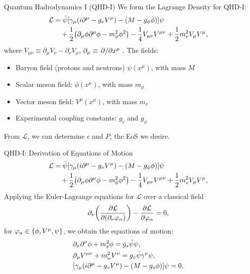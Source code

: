 \documentclass[handout]{beamer}
\newcommand{\Letter}[1]{\mathcal{#1}}
\newcommand{\Lag}{\Letter{L}}
\newcommand{\Def}{\equiv}
\newcommand{\p}{\partial}
\begin{document}
    \begin{frame}{Quantum Hadrodynamics I (QHD-I)}
        We form the Lagrange Density for QHD-I: \pause
        \begin{align*}
            \Lag & = \bar{\psi} \bqty{\gamma_\mu(i\p^\mu -g_v V^\mu) - (M-g_\phi\phi)} \psi \nonumber\\
            & \quad + \frac{1}{2} \pqty{\p_\mu \phi \p^\mu \phi - m_\phi^2 \phi^2} - \frac{1}{4} V_{\mu\nu}V^{\mu\nu} + \frac{1}{2} m_v^2 V_\mu V^\mu,
        \end{align*}
        where $V_{\mu\nu}\Def\p_\mu V_\nu - \p_\nu V_\mu$, $\p_\mu \Def \pdv*{x^\mu}.$ The fields:
        \begin{itemize}
            \item Baryon field (protons and neutrons) $\psi(x^\mu)$, with mass $M$ 
            \item Scalar meson field: $\phi(x^\mu)$, with mass $m_\phi$ 
            \item Vector meson field: $V^\mu(x^\mu)$, with mass $m_v$
            \item Experimental coupling constants: $g_v$ and $g_\phi$ \pause
        \end{itemize}
        From $\Lag$, we can determine $\epsilon$ and $P$, the EoS we desire.
    \end{frame}

    \begin{frame}{QHD-I: Derivation of Equations of Motion}
        \begin{align*}
            \Lag & = \bar{\psi} \bqty{\gamma_\mu(i\p^\mu -g_v V^\mu) - (M-g_\phi\phi)} \psi \nonumber\\
            & \quad + \frac{1}{2} \pqty{\p_\mu \phi \p^\mu \phi - m_\phi^2 \phi^2} - \frac{1}{4} V_{\mu\nu}V^{\mu\nu} + \frac{1}{2} m_v^2 V_\mu V^\mu,
        \end{align*}\pause
        Applying the Euler-Lagrange equations for $\Lag$ over a classical field
        \[\p_\nu\qty(\pdv{\Lag}{(\p_\nu \varphi_\alpha)}) - \pdv{\Lag}{\varphi_\alpha} = 0,\]
        for $\varphi_\alpha \in \Bqty{\phi, V^\mu, \psi}$, \pause we obtain the equations of motion:
        \begin{align*}
            &\p_\nu \p^\nu \phi + m_s^2\phi = g_s\bar{\psi}\psi,\\
            &\p_\mu V^{\mu\nu} + m_\omega^2 V^\nu = g_v \bar\psi \gamma^\nu \psi,\\
            &\bqty{\gamma_\mu(i\p^\mu -g_v V^\mu) - (M-g_s\phi)} \psi = 0,\\
        \end{align*}
    \end{frame}
\end{document}
